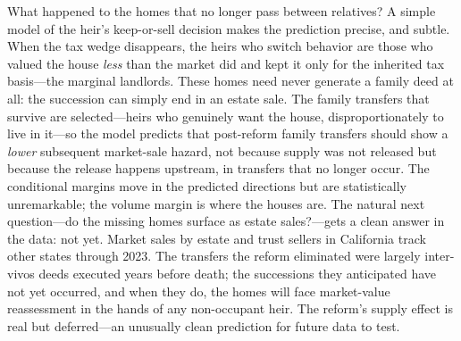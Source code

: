 \documentclass[12pt, letterpaper]{article}
\begin{document}
What happened to the homes that no longer pass between relatives? A simple
model of the heir's keep-or-sell decision makes the prediction precise, and
subtle. When the tax wedge disappears, the heirs who switch behavior are
those who valued the house \emph{less} than the market did and kept it only
for the inherited tax basis---the marginal landlords. These homes need never
generate a family deed at all: the succession can simply end in an estate
sale. The family transfers that survive are selected---heirs who genuinely
want the house, disproportionately to live in it---so the model predicts
that post-reform family transfers should show a \emph{lower} subsequent
market-sale hazard, not because supply was not released but because the
release happens upstream, in transfers that no longer occur. The conditional
margins move in the predicted directions but are statistically
unremarkable; the volume margin is where the houses are. The natural next
question---do the missing homes surface as estate sales?---gets a clean
answer in the data: not yet. Market sales by estate and trust sellers in
California track other states through 2023. The transfers the reform
eliminated were largely inter-vivos deeds executed years before death; the
successions they anticipated have not yet occurred, and when they do, the
homes will face market-value reassessment in the hands of any non-occupant
heir. The reform's supply effect is real but deferred---an unusually clean
prediction for future data to test.
\end{document}
